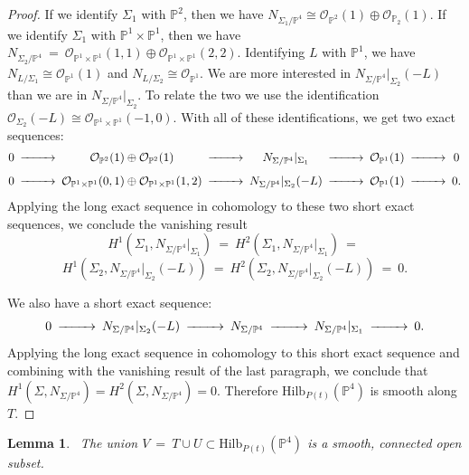 \documentclass[twoside,12pt,reqno]{amsart}
\theoremstyle{plain}
\newtheorem{lem}[thm]{Lemma}
\theoremstyle{definition}
\newcommand{\PP}{\mathbb{P}}
\def\ps{\vspace{4pt}}
\newcommand{\OO}{\mathcal O}
\begin{document}
\begin{proof}
If we identify $\Sigma_1$ with $\PP^2$, then we have
$N_{\Sigma_1/\PP^4}\cong \OO_{\PP^2}(1)\oplus \OO_{\PP_2}(1)$.  If we
identify $\Sigma_1$ with $\PP^1\times\PP^1$, then we have
$N_{\Sigma_2/\PP^4} ~=~ \OO_{\PP^1\times \PP^1}(1,1) \oplus
\OO_{\PP^1\times\PP^1}(2,2)$.  Identifying $L$ with $\PP^1$, we have
$N_{L/\Sigma_1} \cong \OO_{\PP^1}(1)$ and $N_{L/\Sigma_2} \cong
\OO_{\PP^1}$.  We are more interested in
$N_{\Sigma/\PP^4}|_{\Sigma_2}(-L)$ than we are in
$N_{\Sigma/\PP^4}|_{\Sigma_2}$.  To relate the two we use the
identification $\OO_{\Sigma_2}(-L) \cong \OO_{\PP^1\times
\PP^1}(-1,0)$.  With all of these identifications, we get two exact
sequences: 
\begin{equation}\begin{CD}
0 @>>> \OO_{\PP^2}(1)\oplus \OO_{\PP^2}(1) @>>>
N_{\Sigma/\PP^4}|_{\Sigma_1} @>>> \OO_{\PP^1}(1) @>>> 0 \\
0 @>>> \OO_{\PP^1\times \PP^1}(0,1)\oplus \OO_{\PP^1\times \PP^1}(1,2)
@>>> N_{\Sigma/\PP^4}|_{\Sigma_2}(-L) @>>> \OO_{\PP^1}(1) @>>> 0.
\end{CD} \end{equation}
Applying the long exact sequence in cohomology to these two short
exact sequences, we conclude the vanishing result 
\begin{equation}H^1(\Sigma_1,N_{\Sigma/\PP^4}|_{\Sigma_1}) ~=~
H^2(\Sigma_1,N_{\Sigma/\PP^4}|_{\Sigma_1}) ~=~ \end{equation}
\begin{equation}H^1(\Sigma_2,N_{\Sigma/\PP^4}|_{\Sigma_2}(-L)) ~=~
H^2(\Sigma_2,N_{\Sigma/\PP^4}|_{\Sigma_2}(-L)) ~=~ 0.\end{equation}

\ps

We also have a short exact sequence:
\begin{equation}\begin{CD}
0 @>>> N_{\Sigma/\PP^4}|_{\Sigma_2}(-L) @>>> N_{\Sigma/\PP^4} @>>>
N_{\Sigma/\PP^4}|_{\Sigma_1} @>>> 0.
\end{CD}\end{equation}
Applying the long exact sequence in cohomology to this short exact
sequence and combining with the vanishing result of the last
paragraph, we conclude that $H^1(\Sigma,N_{\Sigma/\PP^4})  = 
H^2(\Sigma,N_{\Sigma/\PP^4}) = 0.$  Therefore
$\text{Hilb}_{P(t)}(\PP^4)$ is smooth along $T$.
\end{proof}

\ps

\begin{lem}~\label{lem-smscr}  
The union $V~=~T\cup U\subset \text{Hilb}_{P(t)}(\PP^4)$ is a
smooth, connected open subset.  
\end{lem}
\end{document}
